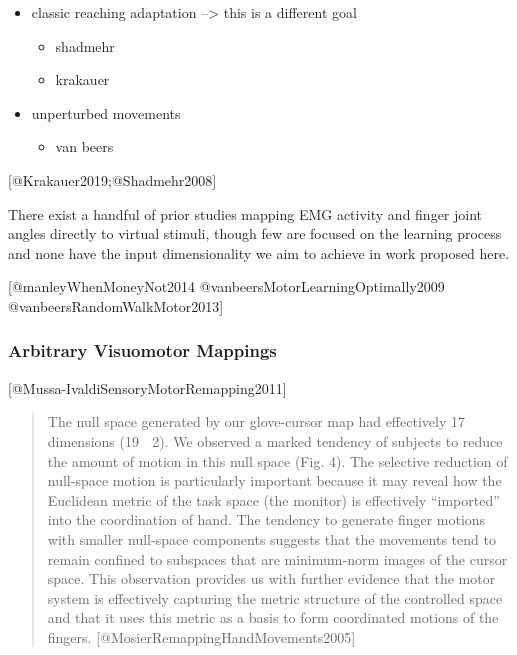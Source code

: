 \documentclass[../main.tex]{subfiles}
\begin{document}
{{{{{{{{{{{\begin{itemize}
\tightlist
\item
  classic reaching adaptation --\textgreater{} this is a different goal

  \begin{itemize}
  \tightlist
  \item
    shadmehr
  \item
    krakauer
  \end{itemize}
\item
  unperturbed movements

  \begin{itemize}
  \tightlist
  \item
    van beers
  \end{itemize}
\end{itemize}

{[}@Krakauer2019;@Shadmehr2008{]}

There exist a handful of prior studies mapping EMG activity and finger
joint angles directly to virtual stimuli, though few are focused on the
learning process and none have the input dimensionality we aim to
achieve in work proposed here.

{[}@manleyWhenMoneyNot2014 @vanbeersMotorLearningOptimally2009
@vanbeersRandomWalkMotor2013{]}

\subsubsection{Arbitrary Visuomotor
Mappings}\label{arbitrary-visuomotor-mappings}

{[}@Mussa-IvaldiSensoryMotorRemapping2011{]}

\begin{quote}
The null space generated by our glove-cursor map had effectively 17
dimensions (19 􏰇 2). We observed a marked tendency of subjects to reduce
the amount of motion in this null space (Fig. 4). The selective
reduction of null-space motion is particularly important because it may
reveal how the Euclidean metric of the task space (the monitor) is
effectively ``imported'' into the coordination of hand. The tendency to
generate finger motions with smaller null-space components suggests that
the movements tend to remain confined to subspaces that are minimum-norm
images of the cursor space. This observation provides us with further
evidence that the motor system is effectively capturing the metric
structure of the controlled space and that it uses this metric as a
basis to form coordinated motions of the fingers.
{[}@MosierRemappingHandMovements2005{]}
\end{quote}

}}}}}}}}}}}
\end{document}
